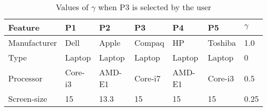 \begin{table}
\renewcommand{\arraystretch}{1.5}
 \centering
 \begin{tabular}{|l| l l l l l |l|}
  \hline \hline
   Feature & P1 & P2 & P3 & P4 & P5 & $\gamma$ \\
  \hline
  Manufacturer & Dell & Apple & Compaq & HP & Toshiba & 1.0 \\
  Type & Laptop & Laptop & Laptop & Laptop & Laptop & 0 \\
  Processor & Core-i3 & AMD-E1 & Core-i7 & AMD-E1 & Core-i3 & 0.5\\
  Screen-size & 15 & 13.3 & 15 & 15 & 15 & 0.25\\
  \hline \hline
 \end{tabular}
 \caption{Values of $\gamma$ when P3 is selected by the user}
 \label{tab:wMLT}
\end{table}

